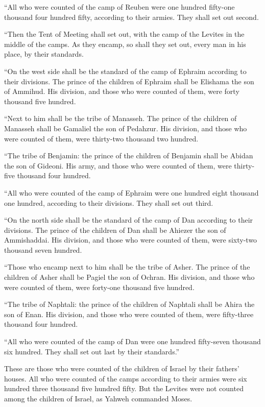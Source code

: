  ``All who were counted of the camp of Reuben were one
hundred fifty-one thousand four hundred fifty, according to their
armies. They shall set out second.

 ``Then the Tent of Meeting shall set out, with the camp of
the Levites in the middle of the camps. As they encamp, so shall they
set out, every man in his place, by their standards.

 ``On the west side shall be the standard of the camp of
Ephraim according to their divisions. The prince of the children of
Ephraim shall be Elishama the son of Ammihud.  His
division, and those who were counted of them, were forty thousand five
hundred.

 ``Next to him shall be the tribe of Manasseh. The prince
of the children of Manasseh shall be Gamaliel the son of Pedahzur.
 His division, and those who were counted of them, were
thirty-two thousand two hundred.

 ``The tribe of Benjamin: the prince of the children of
Benjamin shall be Abidan the son of Gideoni.  His army, and
those who were counted of them, were thirty-five thousand four hundred.

 ``All who were counted of the camp of Ephraim were one
hundred eight thousand one hundred, according to their divisions. They
shall set out third.

 ``On the north side shall be the standard of the camp of
Dan according to their divisions. The prince of the children of Dan
shall be Ahiezer the son of Ammishaddai.  His division, and
those who were counted of them, were sixty-two thousand seven hundred.

 ``Those who encamp next to him shall be the tribe of
Asher. The prince of the children of Asher shall be Pagiel the son of
Ochran.  His division, and those who were counted of them,
were forty-one thousand five hundred.

 ``The tribe of Naphtali: the prince of the children of
Naphtali shall be Ahira the son of Enan.  His division, and
those who were counted of them, were fifty-three thousand four hundred.

 ``All who were counted of the camp of Dan were one hundred
fifty-seven thousand six hundred. They shall set out last by their
standards.''

 These are those who were counted of the children of Israel
by their fathers' houses. All who were counted of the camps according to
their armies were six hundred three thousand five hundred fifty.
 But the Levites were not counted among the children of
Israel, as Yahweh commanded Moses.

